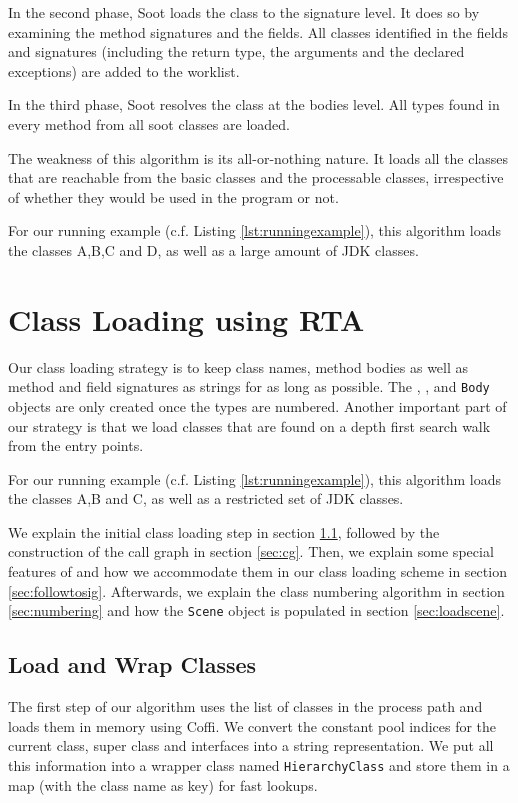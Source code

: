 \documentclass{sigplanconf}
\begin{document}
In the second phase, Soot loads the class to the signature level. It does so by examining the method signatures and the fields. All classes identified in the fields and signatures (including the return type, the arguments and the declared exceptions) are added to the worklist.

In the third phase, Soot resolves the class at the bodies level. All types found in every method from all soot classes are loaded.

The weakness of this algorithm is its all-or-nothing nature. It loads all the classes that are reachable from the basic classes and the processable classes, irrespective of whether they would be used in the program or not.

For our running example (c.f. Listing \ref{lst:runningexample}), this algorithm loads the classes A,B,C and D, as well as a large amount of JDK classes.

\section{Class Loading using RTA}
\label{sec:new-cl}
Our class loading strategy is to keep class names, method bodies as well as method and field signatures as strings for as long as possible.
The \sootclass, \sootmethod, \sootfield and {\tt Body} objects are only created once the types are numbered. Another important part of our strategy is that we load classes that are found on a depth first search walk from the entry points.

For our running example (c.f. Listing \ref{lst:runningexample}), this algorithm loads the classes A,B and C, as well as a restricted set of JDK classes. %

We explain the initial class loading step in section \ref{sec:loading}, followed by the construction of the call graph in section \ref{sec:cg}. Then, we explain some special features of \rb and how we accommodate them in our class loading scheme in section \ref{sec:followtosig}. Afterwards, we explain the class numbering algorithm in section \ref{sec:numbering} and how the {\tt Scene} object is populated in section \ref{sec:loadscene}.

\subsection{Load and Wrap Classes}
\label{sec:loading}
The first step of our algorithm uses the list of classes in the process path and loads them in memory using Coffi. We convert the constant pool indices for the current class, super class and interfaces into a string representation. We put all this information into a wrapper class named {\tt HierarchyClass} and store them in a map (with the class name as key) for fast lookups.
\end{document}
